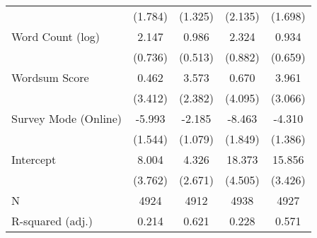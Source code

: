 \begin{table}[h]
\begin{tabular}{lcccc}
   & (1.784) & (1.325) & (2.135) & (1.698) \\ 
  Word Count (log) &   2.147 &   0.986 &   2.324 &   0.934 \\ 
   & (0.736) & (0.513) & (0.882) & (0.659) \\ 
  Wordsum Score &   0.462 &   3.573 &   0.670 &   3.961 \\ 
   & (3.412) & (2.382) & (4.095) & (3.066) \\ 
  Survey Mode (Online) &  -5.993 &  -2.185 &  -8.463 &  -4.310 \\ 
   & (1.544) & (1.079) & (1.849) & (1.386) \\ 
  Intercept &   8.004 &   4.326 &  18.373 &  15.856 \\ 
   & (3.762) & (2.671) & (4.505) & (3.426) \\ 
   \hline
N & 4924 & 4912 & 4938 & 4927 \\ 
  R-squared (adj.) & 0.214 & 0.621 & 0.228 & 0.571 \\ 
   \hline
\end{tabular}
\endgroup
\end{table}
